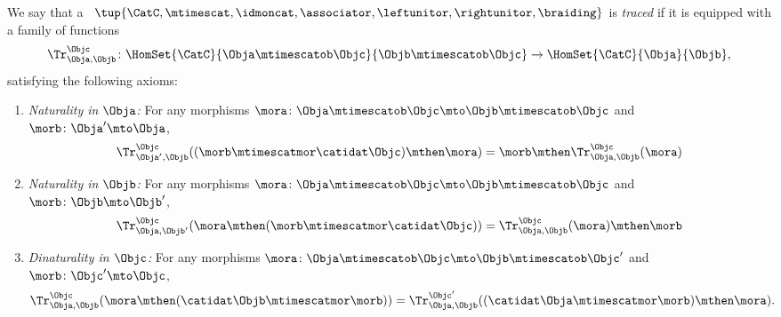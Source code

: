 \begin{ctdefinition}
    \label{def:traced-monoidal-cat}
    \label{def:traced-monoidal-category}
    We say that a ~$\tup{\CatC, \mtimescat, \idmoncat, \associator, \leftunitor, \rightunitor, \braiding}$ is \emph{traced} if it is equipped with a family of functions
    \begin{equation}
        \Tr_{\Obja,\Objb}^\Objc\colon \HomSet{\CatC}{\Obja \mtimescatob \Objc}{\Objb\mtimescatob \Objc}\to \HomSet{\CatC}{\Obja}{\Objb},
    \end{equation}
    satisfying the following axioms:
    \begin{enumerate}
        \item \emph{Naturality in $\Obja$:} For any morphisms $\mora\colon \Obja\mtimescatob \Objc \mto \Objb\mtimescatob \Objc$ and $\morb \colon \Obja' \mto \Obja$,
              \begin{equation}\label{eq:trace-naturality-1}
                  \Tr_{\Obja', \Objb}^\Objc ( (\morb \mtimescatmor \catidat\Objc) \mthen \mora) = \morb \mthen \Tr_{\Obja, \Objb}^\Objc (\mora)
              \end{equation}
        \item \emph{Naturality in $\Objb$:} For any morphisms $\mora\colon \Obja\mtimescatob \Objc \mto \Objb\mtimescatob \Objc$ and $\morb \colon \Objb \mto \Objb'$,
              \begin{equation}\label{eq:trace-naturality-2}
                  \Tr_{\Obja, \Objb'}^\Objc ( \mora \mthen (\morb \mtimescatmor \catidat\Objc) ) = \Tr_{\Obja, \Objb}^\Objc (\mora) \mthen \morb
              \end{equation}
        \item \emph{Dinaturality in $\Objc$:} 
        For any morphisms $\mora \colon \Obja \mtimescatob \Objc \mto \Objb \mtimescatob \Objc'$ and $\morb \colon \Objc' \mto \Objc$,
              \begin{equation}\label{eq:trace-dinaturality}
                  \Tr_{\Obja, \Objb}^{\Objc} (\mora \mthen (\catidat\Objb \mtimescatmor \morb)) = \Tr_{\Obja, \Objb}^{\Objc'}((\catidat\Obja \mtimescatmor \morb) \mthen \mora).
              \end{equation}


\end{enumerate}
\end{ctdefinition}
